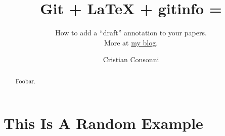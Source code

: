 \documentclass{imports/sig-alternate}
\begin{document}
\title{Git + LaTeX + gitinfo = {\Huge \Heart}}
\subtitle{How to add a ``draft'' annotation to your papers. \\
More at \href{https://balist.es/blog/2016/11/02/git-latex-gitinfo-draft-watermark/}{my blog}.}
\author{Cristian Consonni}

\maketitle

\begin{abstract}

Foobar.

\end{abstract}

\section{This Is A Random Example}

\blindmathpaper
\end{document}
